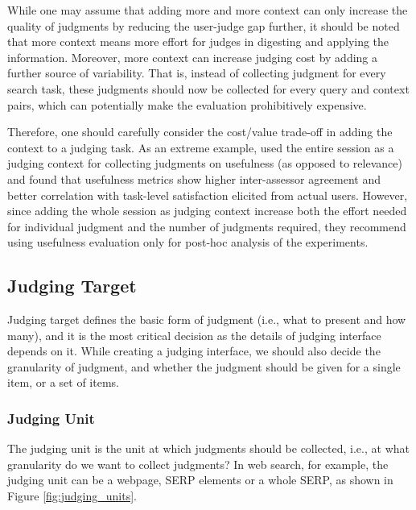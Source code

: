 While one may assume that adding more and more context can only increase the quality of judgments by reducing the user-judge gap further, it should be noted that more context means more effort for judges in digesting and applying the information. Moreover, more context can increase judging cost by adding a further source of variability. That is, instead of collecting judgment for every search task, these judgments should now be collected for every query and context pairs, which can potentially make the evaluation prohibitively expensive.

Therefore, one should carefully consider the cost/value trade-off in adding the context to a judging task. As an extreme example, \cite{Mao:2016} used the entire session as a judging context for collecting judgments on usefulness (as opposed to relevance) and found that usefulness metrics show higher inter-assessor agreement and better correlation with task-level satisfaction elicited from actual users. However, since adding the whole session as judging context increase both the effort needed for individual judgment and the number of judgments required, they recommend using usefulness evaluation only for post-hoc analysis of the experiments.

\subsection{Judging Target}
Judging target defines the basic form of judgment (i.e., what to present  and how many), and it is the most critical decision as the details of judging interface depends on it. While creating a judging interface, we should also decide the granularity of judgment, and whether the judgment should be given for a single item, or a set of items. 

\subsubsection{Judging Unit}
The judging unit is the unit at which judgments should be collected, i.e., at what granularity do we want to collect judgments? In web search, for example, the judging unit can be a webpage, SERP elements or a whole SERP, as shown in Figure \ref{fig:judging_units}. 

